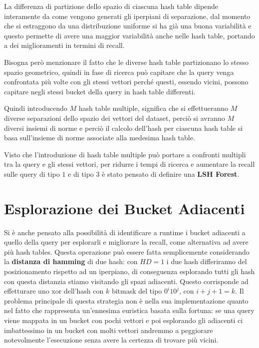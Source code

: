 La differenza di partizione dello spazio di ciascuna hash table dipende interamente 
da come vengono generati gli iperpiani di separazione, dal momento che si estraggono 
da una distribuzione uniforme si ha già una buona variabilità e questo permette di avere 
una maggior variabilità anche nelle hash table, portando a dei miglioramenti in termini di 
recall.

Bisogna però menzionare il fatto che le diverse hash table partizionano lo stesso 
spazio geometrico, quindi in fase di ricerca può capitare che la query venga confrontata 
più volte con gli stessi vettori perché questi, essendo vicini, possono capitare 
negli stessi bucket della query in hash table differenti.

Quindi introducendo $M$ hash table multiple, significa che si effettueranno $M$ 
diverse separazioni dello spazio dei vettori del dataset, perciò si avranno 
$M$ diversi insiemi di norme e perciò il calcolo dell'hash per ciascuna hash table 
si basa sull'insieme di norme associate alla medesima hash table.

Visto che l'introduzione di hash table multiple può portare a confronti multipli 
tra la query e gli stessi vettori, per ridurre i tempi di ricerca e aumentare 
la recall sulle query di tipo $1$ e di tipo $3$ è stato pensato di definire una 
\textbf{LSH Forest}.

\section{Esplorazione dei Bucket Adiacenti}

Si \`e anche pensato alla possibilit\`a di identificare a runtime i bucket adiacenti a quello della query per esplorarli e migliorare la recall, come alternativa ad avere pi\`u hash tables.
Questa operazione pu\`o essere fatta semplicemente considerando la \textbf{distanza di hamming} di due hash: con $HD = 1$ i due hash differiranno del posizionamento rispetto ad un iperpiano, di conseguenza esplorando tutti gli hash con questa distanzia stiamo visitando gli spazi adiacenti. Questo corrisponde ad effetturare uno xor dell'hash con $k$ bitmask del tipo $0^i10^j$, con $i + j + 1 = k$.
Il problema principale di questa strategia non \`e nella sua implementazione quanto nel fatto che rappresenta un'ennesima euristica basata sulla fortuna: se una query viene mappata in un bucket con pochi vettori e poi esplorando gli adiacenti ci imbattessimo in un bucket con molti vettori andremmo a peggiorare notevolmente l'esecuzione senza avere la certezza di trovare pi\`u vicini.

